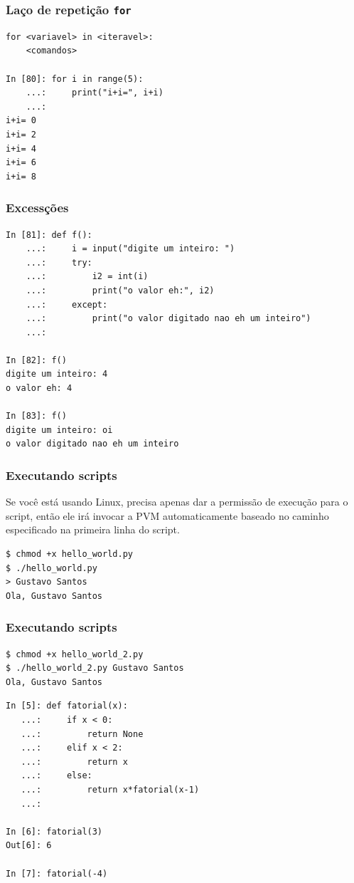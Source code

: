 \documentclass[aspectratio=169]{beamer}
\begin{document}
\begin{frame}[fragile]
	\frametitle{Laço de repetição \texttt{for}}
	\begin{lstlisting}
for <variavel> in <iteravel>:
	<comandos>

In [80]: for i in range(5):
    ...:     print("i+i=", i+i)
    ...:
i+i= 0
i+i= 2
i+i= 4
i+i= 6
i+i= 8
	\end{lstlisting}
\end{frame}


\begin{frame}[fragile]
	\frametitle{Excessções}
	\begin{lstlisting}
In [81]: def f():
    ...:     i = input("digite um inteiro: ")
    ...:     try:
    ...:         i2 = int(i)
    ...:         print("o valor eh:", i2)
    ...:     except:
    ...:         print("o valor digitado nao eh um inteiro")
    ...:

In [82]: f()
digite um inteiro: 4
o valor eh: 4

In [83]: f()
digite um inteiro: oi
o valor digitado nao eh um inteiro
	\end{lstlisting}
\end{frame}


\begin{frame}[fragile]
	\frametitle{Executando scripts}

	

	Se você está usando Linux, precisa apenas dar a permissão de execução para o script,
então ele irá invocar a PVM automaticamente baseado no caminho especificado na primeira
linha do script.

	\begin{lstlisting}
$ chmod +x hello_world.py
$ ./hello_world.py
> Gustavo Santos
Ola, Gustavo Santos
	\end{lstlisting}
\end{frame}

\begin{frame}[fragile]
	\frametitle{Executando scripts}

	

	\begin{lstlisting}
$ chmod +x hello_world_2.py
$ ./hello_world_2.py Gustavo Santos
Ola, Gustavo Santos
	\end{lstlisting}
\end{frame}

\begin{frame}[fragile]
	\begin{lstlisting}
In [5]: def fatorial(x):
   ...:     if x < 0:
   ...:         return None
   ...:     elif x < 2:
   ...:         return x
   ...:     else:
   ...:         return x*fatorial(x-1)
   ...:

In [6]: fatorial(3)
Out[6]: 6

In [7]: fatorial(-4)
	\end{lstlisting}
\end{frame}
\end{document}
